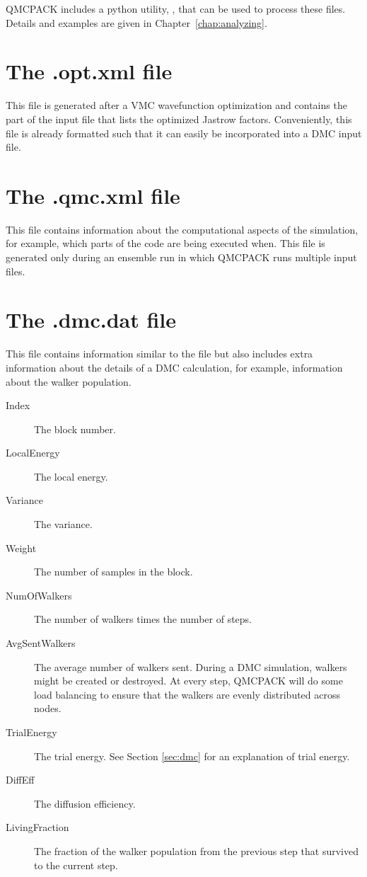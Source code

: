 QMCPACK includes a python utility, , that can be used to process these files. Details and examples are given in Chapter~\ref{chap:analyzing}.
\section{The .opt.xml file}
\label{sec:optxml_file}
This file is generated after a VMC wavefunction optimization and contains the part of the input file that lists the optimized Jastrow factors.
Conveniently, this file is already formatted such that it can easily be incorporated into a DMC input file.

\section{The .qmc.xml file}
\label{sec:qmc_file}
This file contains information about the computational aspects of the simulation, for example, which parts of the code are being executed when. This file is generated only during an ensemble run in which QMCPACK runs multiple input files.

\section{The .dmc.dat file}
\label{sec:dmc_file}
This file contains information similar to the  file but also includes extra information about the details of a DMC calculation, for example, information about the walker population.

\begin{description}
\item[Index] The block number.
\item[LocalEnergy] The local energy.
\item[Variance] The variance.
\item[Weight] The number of samples in the block.
\item[NumOfWalkers] The number of walkers times the number of steps.
\item[AvgSentWalkers] The average number of walkers sent. During a DMC simulation, walkers might be created or destroyed. At every step, QMCPACK will do some load balancing to ensure that the walkers are evenly distributed across nodes.
\item[TrialEnergy] The trial energy. See Section \ref{sec:dmc} for an explanation of trial energy.
\item[DiffEff] The diffusion efficiency.
\item[LivingFraction] The fraction of the walker population from the previous step that survived to the current step.
\end{description}


